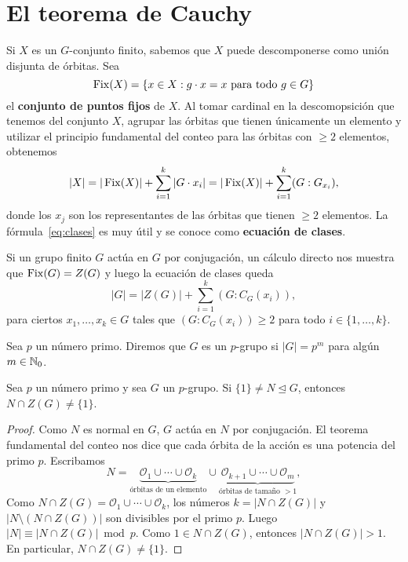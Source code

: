 \chapter{El teorema de Cauchy}

Si $X$ es un $G$-conjunto finito, sabemos que $X$ puede descomponerse como unión disjunta de órbitas. Sea 
\[
\operatorname{Fix}(X)=\{x\in X:g\cdot x=x\text{ para todo $g\in G$}\}
\]
el \textbf{conjunto de puntos fijos} de $X$. Al tomar cardinal en la descomopsición que tenemos del conjunto $X$, 
agrupar las órbitas que tienen únicamente un elemento y 
utilizar el principio fundamental del conteo para las órbitas con $\geq2$ elementos, obtenemos
\begin{equation}
\label{eq:clases}	
|X|=|\operatorname{Fix}(X)|+\sum_{i=1}^k|G\cdot x_i|
=|\operatorname{Fix}(X)|+\sum_{i=1}^k(G:G_{x_i}),
\end{equation}
donde los $x_j$ son los representantes de las órbitas que tienen $\geq2$ elementos. La fórmula~\eqref{eq:clases} es muy útil y se conoce como
\textbf{ecuación de clases}. 

\begin{example}
Si un grupo finito $G$ actúa en $G$ por conjugación, un cálculo directo nos muestra que $\operatorname{Fix}(G)=Z(G)$ y luego la ecuación de clases queda
\[
|G|=|Z(G)|+\sum_{i=1}^k(G:C_G(x_i)),	
\]
para ciertos $x_1,\dots,x_k\in G$ tales que 
$(G:C_G(x_i))\geq2$ para todo $i\in\{1,\dots,k\}$. 
\end{example}


\begin{definition}
Sea $p$ un número primo. Diremos que $G$ es un $p$-grupo si $|G|=p^m$ para algún $m\in\mathbb{N}_0$.  	
\end{definition}

\begin{theorem}
Sea $p$ un número primo y 
sea $G$ un $p$-grupo. Si $\{1\}\ne N\unlhd G$, entonces $N\cap Z(G)\ne\{1\}$. 	
\end{theorem}

\begin{proof}
Como $N$ es normal en $G$, $G$ actúa en $N$ por conjugación. El teorema fundamental del conteo nos dice que cada órbita de la acción es una potencia del primo $p$. Escribamos
\[
N=\underbrace{\mathcal{O}_1\cup\cdots\cup \mathcal{O}_k}_{\text{órbitas de un elemento}}\cup\underbrace{\mathcal{O}_{k+1}\cup\cdots\cup\mathcal{O}_m}_{\text{órbitas de tamaño $>1$}},
\]	
Como $N\cap Z(G)=\mathcal{O}_1\cup\cdots\cup\mathcal{O}_k$, los números $k=|N\cap Z(G)|$ y $|N\setminus(N\cap Z(G))|$ son divisibles por el primo $p$. Luego
$|N|\equiv|N\cap Z(G)|\bmod p$. Como $1\in N\cap Z(G)$, entonces $|N\cap Z(G)|>1$. En particular, $N\cap Z(G)\ne\{1\}$. 
\end{proof}

